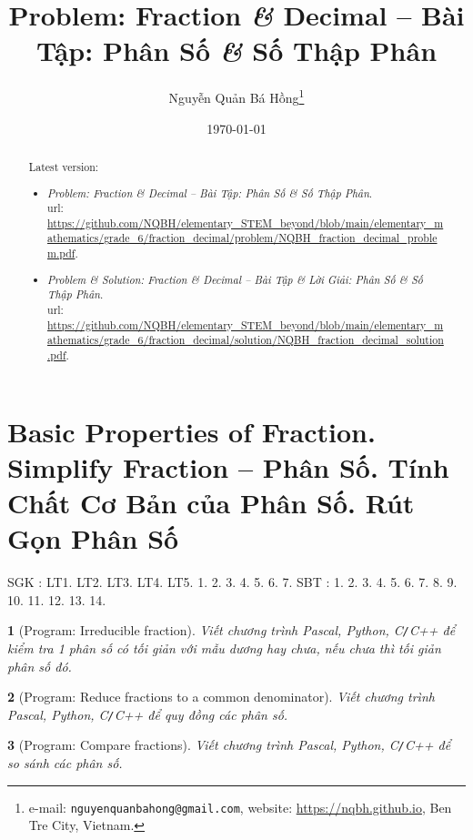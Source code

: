 \documentclass{article}
\title{Problem: Fraction {\it\&} Decimal -- Bài Tập: Phân Số {\it\&} Số Thập Phân}
\author{Nguyễn Quản Bá Hồng\footnote{e-mail: \texttt{nguyenquanbahong@gmail.com}, website: \url{https://nqbh.github.io}, Ben Tre City, Vietnam.}}
\date{\today}
\newtheorem{baitoan}{}
\begin{document}
\maketitle
\begin{abstract}
	Latest version:
	\begin{itemize}
		\item \textit{Problem: Fraction \& Decimal -- Bài Tập: Phân Số {\it\&} Số Thập Phân}.\\{\sc url}: \url{https://github.com/NQBH/elementary_STEM_beyond/blob/main/elementary_mathematics/grade_6/fraction_decimal/problem/NQBH_fraction_decimal_problem.pdf}.
		\item \textit{Problem \& Solution: Fraction \& Decimal -- Bài Tập \& Lời Giải: Phân Số {\it\&} Số Thập Phân}.\\{\sc url}: \url{https://github.com/NQBH/elementary_STEM_beyond/blob/main/elementary_mathematics/grade_6/fraction_decimal/solution/NQBH_fraction_decimal_solution.pdf}.
	\end{itemize}
\end{abstract}
\tableofcontents


\section{Basic Properties of Fraction. Simplify Fraction -- Phân Số. Tính Chất Cơ Bản của Phân Số. Rút Gọn Phân Số}
SGK \cite[Chap. V, \S1, pp. 25--30]{SGK_Toan_6_Canh_Dieu_tap_2}: LT1. LT2. LT3. LT4. LT5. 1. 2. 3. 4. 5. 6. 7. SBT \cite[Chap. V, \S1, pp. 29--32]{SBT_Toan_6_Canh_Dieu_tap_2}: 1. 2. 3. 4. 5. 6. 7. 8. 9. 10. 11. 12. 13. 14.

\begin{baitoan}[{\sf Program}: Irreducible fraction]
	Viết chương trình {\sf Pascal, Python, C{\tt/}C++} để kiểm tra 1 phân số có tối giản với mẫu dương hay chưa, nếu chưa thì tối giản phân số đó.
\end{baitoan}

\begin{baitoan}[{\sf Program}: Reduce fractions to a common denominator]
	Viết chương trình {\sf Pascal, Python, C{\tt/}C++} để quy đồng các phân số.
\end{baitoan}

\begin{baitoan}[{\sf Program}: Compare fractions]
	Viết chương trình {\sf Pascal, Python, C{\tt/}C++} để so sánh các phân số.
\end{baitoan}
\end{document}
